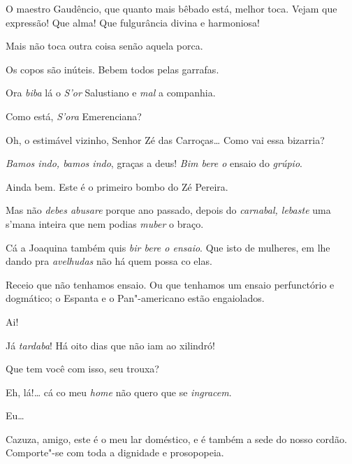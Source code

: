 \begin{linenumbers}



  O maestro Gaudêncio, que quanto mais
bêbado está, melhor toca. Vejam que expressão! Que alma! Que fulgurância divina
e harmoniosa!

 Mais não toca outra coisa senão aquela
porca. 

   Os copos são
inúteis. Bebem todos pelas garrafas. 

  Ora \textit{biba} lá o \textit{S'or} Salustiano e \textit{mal} a companhia.

 Como está, \textit{S'ora} Emerenciana?

 Oh, o estimável vizinho, Senhor Zé das Carroças\ldots{} Como vai
essa bizarria?

 \textit{Bamos indo, bamos indo}, graças a deus!  \textit{Bim bere o}
ensaio do \textit{grúpio}.

 Ainda bem.   Este é o primeiro bombo
do Zé Pereira.

 Mas não \textit{debes abusare} porque ano passado,
depois do \textit{carnabal, lebaste} uma s'mana inteira que nem
podias \textit{muber} o braço.

 Cá a Joaquina também quis \textit{bir bere o ensaio}. Que isto de
mulheres, em lhe dando pra \textit{avelhudas} não há quem possa co elas.

 Receio que não tenhamos ensaio. Ou que tenhamos um ensaio
perfunctório e dogmático; o Espanta e o Pan"-americano estão engaiolados.

 Ai!

 Já \textit{tardaba}! Há oito dias que não iam ao xilindró!

   Que tem você com isso,
seu trouxa?

 Eh, lá!\ldots{} cá co meu \textit{home} não quero que se
\textit{ingracem}.

 Eu\ldots{}

 Cazuza, amigo, este é o meu lar doméstico, e é 
também a sede do nosso cordão. Comporte"-se com toda a dignidade e prosopopeia.


\end{linenumbers}
